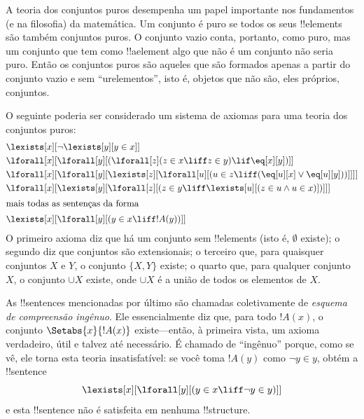 \documentclass[../../../include/open-logic-section]{subfiles}
\begin{document}
\begin{ex}
A teoria dos conjuntos puros desempenha um papel importante nos fundamentos
(e na filosofia) da matemática.  Um conjunto é puro se todos os seus
!!{element}s são também conjuntos puros.  O conjunto vazio conta, portanto, como
puro, mas um conjunto que tem como !!a{element} algo que não é um conjunto
não seria puro.  Então os conjuntos puros são aqueles que são formados apenas
a partir do conjunto vazio e sem ``urelementos'', isto é, objetos que não são,
eles próprios, conjuntos.

O seguinte poderia ser considerado um sistema de axiomas para uma teoria dos
conjuntos puros:
\begin{align*}
& \lexists[x][\lnot \lexists[y][y \in x]]\\
& \lforall[x][\lforall[y][(\lforall[z](z \in x \liff z \in y) \lif 
\eq[x][y])]]\\
& \lforall[x][\lforall[y][\lexists[z][\lforall[u][(u \in z \liff
(\eq[u][x] \lor \eq[u][y]))]]]]\\
& \lforall[x][\lexists[y][\lforall[z][(z \in y \liff \lexists[u][(z \in
        u \land u \in x)])]]]\\
\intertext{mais todas as sentenças da forma} &
\lexists[x][\lforall[y][(y \in x \liff !A(y))]]
\end{align*}
O primeiro axioma diz que há um conjunto sem !!{element}s (isto é,
$\emptyset$ existe); o segundo diz que conjuntos são extensionais; o
terceiro que, para quaisquer conjuntos $X$ e $Y$, o conjunto $\{X, Y\}$ existe; o
quarto que, para qualquer conjunto $X$, o conjunto $\cup X$ existe, onde $\cup X$ é a 
união de todos os elementos de $X$.

As !!{sentence}s mencionadas por último são chamadas coletivamente de
\emph{esquema de compreensão ingênuo}.  Ele essencialmente diz que, para todo
$!A(x)$, o conjunto $\Setabs{x}{!A(x)}$ existe---então, à primeira vista, um
axioma verdadeiro, útil e talvez até necessário.  É chamado de ``ingênuo''
porque, como se vê, ele torna esta teoria insatisfatível: se você
toma $!A(y)$ como $\lnot y \in y$, obtém a !!{sentence}
\[
\lexists[x][\lforall[y][(y \in x \liff \lnot y \in y)]]
\]
e esta !!{sentence} não é satisfeita em nenhuma !!{structure}.
\end{ex}
\end{document}
